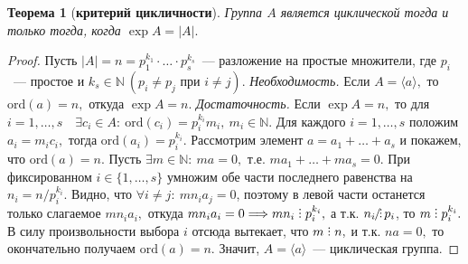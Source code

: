 \documentclass[a4paper, 14pt]{extarticle}
\newcommand{\naturals}{\mathbb{N}}
\newcommand{\ord}{\mathrm{ord}}
\newcommand{\suchthat}{{:}{ } \ }
\DeclareRobustCommand{\divby}{%
	\mathrel{\text{\vbox{\baselineskip.65ex\lineskiplimit0pt\hbox{.}\hbox{.}\hbox{.}}}}%
}
\DeclareRobustCommand{\ndivby}{%
	\mathrel{\text{%
			\vbox{\baselineskip.65ex\lineskiplimit0pt\hbox{.}\hbox{.}\hbox{.}}%
			\kern-1.5ex\hbox{/}%
	}}%
}
\theoremstyle{definition}
\theoremstyle{plain}
\newtheorem*{theorem*}{Теорема}
\numberwithin{theorem}{section}
\numberwithin{definition}{section}
\numberwithin{statement}{section}
\numberwithin{lemma}{section}
\numberwithin{consequence}{section}
\begin{document}
        \newpage
	\begin{theorem*}[\textbf{критерий цикличности}]
		Группа $A$ является циклической тогда и только тогда, когда ${\exp A = |A|.}$
	\end{theorem*}
	\begin{proof}
		Пусть ${|A| = n = p^{k_1}_1 \cdot \ldots \cdot p^{k_s}_s}$~--- разложение на простые множители, где $p_i$~--- простое и ${k_s \in \naturals \ (p_i \neq p_j \text{ при } i \neq j).}$ \newline
		{\textit{Необходимость.}} Если ${A = \langle a \rangle,}$ то ${\ord (a) = n,}$ откуда ${\exp A = n.}$ \newline
		{\textit{Достаточность.}} Если ${\exp A = n,}$ то для ${i = 1, \ldots, s \quad \exists c_i \in A \suchthat \ord(c_i) = p^{k_i}_i m_i, \ m_i \in \naturals.}$ Для каждого ${i = 1, \ldots, s}$ положим ${a_i = m_i c_i,}$ тогда ${\ord(a_i) = p^{k_i}_i.}$ Рассмотрим элемент ${a = a_1 + \ldots + a_s}$ и покажем, что ${\ord(a) = n.}$ Пусть ${\exists m \in \naturals \suchthat ma = 0,}$ т.е. ${ma_1 + \ldots + ma_s = 0.}$ При фиксированном ${i \in \{1, \ldots, s\}}$ умножим обе части последнего равенства на ${n_i = n/p^{k_i}_i.}$ Видно, что ${\forall i \neq j{:} \ mn_ia_j = 0}$, поэтому в левой части останется только слагаемое ${mn_ia_i,}$ откуда ${mn_ia_i = 0 \Longrightarrow mn_i \divby p^{k_i}_i,}$ а т.к. 
		${n_i \ndivby p_i}$, то ${m \divby p^{k_i}_i.}$  В силу произвольности выбора $i$ отсюда вытекает, что ${m \divby n,}$ и т.к. ${na = 0,}$ то окончательно получаем ${\ord(a) = n.}$ Значит, ${A = \langle a \rangle}$~--- циклическая группа.
	\end{proof}
    
        \newpage
\end{document}
